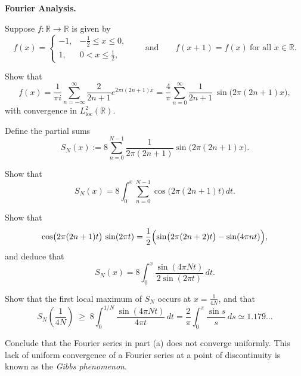 \begin{problem}[CP-II-0366]
\label{prob:cp-ii-0366}
\textbf{Fourier Analysis.}

\hspace*{1.5em}Suppose $f:\mathbb{R}\to\mathbb{R}$ is given by
\[
f(x) =
\begin{cases}
	-1, & -\tfrac12 \le x \le 0,\\[0.3em]
	1, & 0 < x \le \tfrac12,
\end{cases}
\qquad\text{and}\qquad
f(x+1) = f(x)\ \text{for all }x\in\mathbb{R}.
\]

Show that
\[
f(x)
= \frac{1}{\pi i}\sum_{n=-\infty}^{\infty}
\frac{2}{2n+1} e^{2\pi i (2n+1)x}
= \frac{4}{\pi}\sum_{n=0}^{\infty}
\frac{1}{2n+1}\,\sin\bigl(2\pi(2n+1)x\bigr),
\]
with convergence in $L^2_{\mathrm{loc}}(\mathbb{R})$.

Define the partial sums
\[
S_N(x)
:= 8 \sum_{n=0}^{N-1} \frac{1}{2\pi(2n+1)}
\sin\bigl(2\pi(2n+1)x\bigr).
\]

Show that
\[
S_N(x)
= 8 \int_0^x \sum_{n=0}^{N-1}
\cos\bigl(2\pi(2n+1)t\bigr)\,dt.
\]

Show that
\[
\cos\bigl(2\pi(2n+1)t\bigr)\,\sin(2\pi t)
= \frac12\Bigl(\sin\bigl(2\pi(2n+2)t\bigr)
- \sin(4\pi n t)\Bigr),
\]
and deduce that
\[
S_N(x)
= 8 \int_0^x
\frac{\sin(4\pi N t)}{2\sin(2\pi t)}\,dt.
\]

Show that the first local maximum of $S_N$ occurs at
$x = \tfrac{1}{4N}$, and that
\[
S_N\!\left(\frac{1}{4N}\right)
\;\ge\;
8\int_0^{1/N} \frac{\sin(4\pi N t)}{4\pi t}\,dt
= \frac{2}{\pi}\int_0^{\pi} \frac{\sin s}{s}\,ds
\simeq 1.179\ldots
\]

Conclude that the Fourier series in part (a) does not converge
uniformly.  This lack of uniform convergence of a Fourier series at a
point of discontinuity is known as the \emph{Gibbs phenomenon}.
\end{problem}

